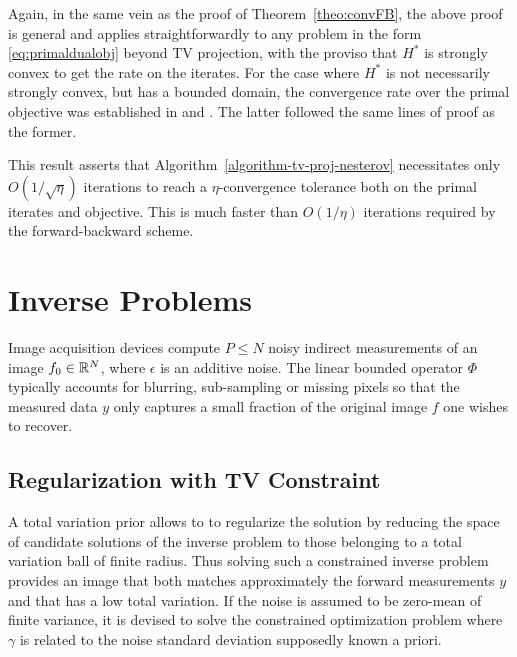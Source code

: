 \documentclass[11pt,nofonttune,a4paper]{IEEEtran}
\newcommand{\tol}{\eta}
\begin{document}
\begin{rem}
Again, in the same vein as the proof of Theorem~\ref{theo:convFB}, the above proof is general and applies straightforwardly to any problem in the form \eqref{eq:primaldualobj} beyond TV projection, with the proviso that $H^*$ is strongly convex to get the rate on the iterates. For the case where $H^*$ is not necessarily strongly convex, but has a bounded domain, the convergence rate over the primal objective was established in \cite[Theorem~3]{nesterov-smooth} and \cite{weiss-phd}. The latter followed the same lines of proof as the former.
\end{rem}

This result asserts that Algorithm~\ref{algorithm-tv-proj-nesterov} necessitates only $O(1/\sqrt{\tol})$ iterations to reach a $\tol$-convergence tolerance both on the primal iterates and objective. This is much faster than $O(1/\tol)$ iterations required by the forward-backward scheme.

\section{Inverse Problems}

Image acquisition devices compute $P \leq N$ noisy indirect measurements 
of an image $f_0 \in \mathbb{R}^N$, where $\epsilon$ is an additive noise.
The linear bounded operator $\Phi$ typically accounts for blurring, sub-sampling or missing pixels so that the measured data $y$ only captures a small fraction of the original image $f$ one wishes to recover.

\subsection{Regularization with TV Constraint}

A total variation prior allows to to regularize the solution by reducing the space of candidate solutions of the inverse problem to those belonging to a total variation ball of finite radius. Thus solving such a constrained inverse problem provides an image that both matches approximately the forward measurements $y$ and that has a low total variation. If the noise is assumed to be zero-mean of finite variance, it is devised to solve the constrained optimization problem
where $\gamma$ is related to the noise standard deviation supposedly known a priori. 
\end{document}
